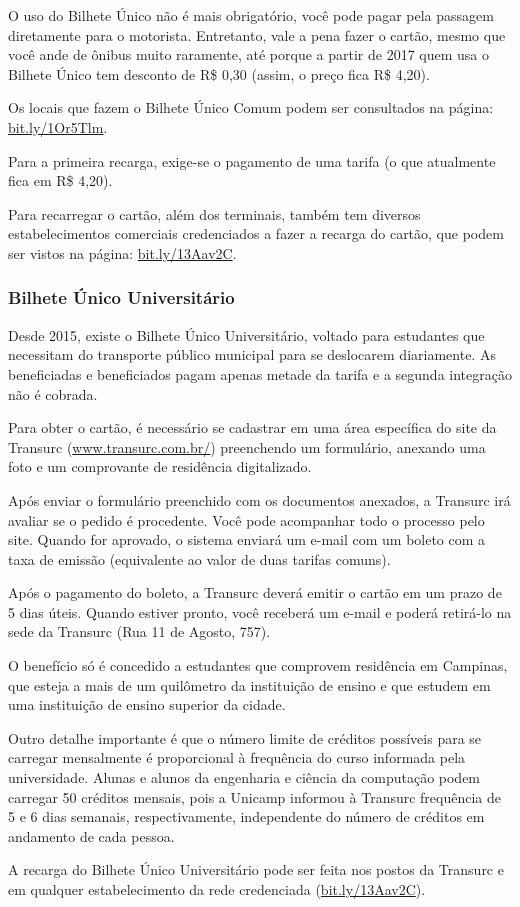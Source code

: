 O uso do Bilhete Único não é mais obrigatório, você pode pagar pela passagem
diretamente para o motorista. Entretanto, vale a pena fazer o cartão, mesmo
que você ande de ônibus muito raramente, até porque a partir de 2017 quem
usa o Bilhete Único tem desconto de R\$ 0,30 (assim, o preço fica R\$ 4,20).

Os locais que fazem o Bilhete Único Comum podem ser consultados na página:
\url{bit.ly/1Or5Tlm}.

Para a primeira recarga, exige-se o pagamento de uma tarifa (o que atualmente
fica em R\$ 4,20).

Para recarregar o cartão, além dos terminais, também tem diversos
estabelecimentos comerciais credenciados a fazer a recarga do cartão, que podem
ser vistos na página: \url{bit.ly/13Aav2C}.

\subsubsection{Bilhete Único Universitário}

Desde 2015, existe o Bilhete Único Universitário, voltado para estudantes que
necessitam do transporte público municipal para se deslocarem diariamente. As
beneficiadas e beneficiados pagam apenas metade da tarifa e a segunda
integração não é cobrada.

Para obter o cartão, é necessário se cadastrar em uma área específica do site
da Transurc (\url{www.transurc.com.br/}) preenchendo um formulário, anexando
uma foto e um comprovante de residência digitalizado.

Após enviar o formulário preenchido com os documentos anexados, a Transurc
irá avaliar se o pedido é procedente. Você pode acompanhar todo o processo pelo
site. Quando for aprovado, o sistema enviará um e-mail com um boleto com a taxa
de emissão (equivalente ao valor de duas tarifas comuns).

Após o pagamento do boleto, a Transurc deverá emitir o cartão em um prazo de
5 dias úteis. Quando estiver pronto, você receberá um e-mail e poderá retirá-lo
na sede da Transurc (Rua 11 de Agosto, 757).

O benefício só é concedido a estudantes que comprovem residência em Campinas,
que esteja a mais de um quilômetro da instituição de ensino e que estudem em
uma instituição de ensino superior da cidade.

Outro detalhe importante é que o número limite de créditos possíveis para se
carregar mensalmente é proporcional à frequência do curso informada pela
universidade. Alunas e alunos da engenharia e ciência da computação podem
carregar 50 créditos mensais, pois a Unicamp informou à Transurc frequência de
5 e 6 dias semanais, respectivamente, independente do número de créditos em
andamento de cada pessoa.

A recarga do Bilhete Único Universitário pode ser feita nos postos da Transurc
e em qualquer estabelecimento da rede credenciada (\url{bit.ly/13Aav2C}).
